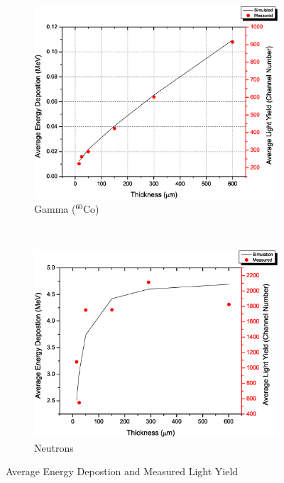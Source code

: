 \documentclass{anstrans}
\newcommand{\iso}[2]{${}^{#2}${#1}}
\newcommand{\figurewidth}{0.45\textwidth}
\begin{document}
\begin{figure}[!ht]
	\centering
	\begin{subfigure}[b]{\figurewidth}
    		\includegraphics[width=\textwidth]{G4EDep_LightYield_Co60}
		\caption{Gamma (\iso{Co}{60})}
	\end{subfigure}%
	~
	\begin{subfigure}[b]{\figurewidth}
    		\includegraphics[width=\textwidth]{G4EDep_LightYield_Neutron}
		\caption{Neutrons}
	\end{subfigure}%
	\caption{Average Energy Depostion and Measured Light Yield}
	\label{fig:EDepLightYeild}
\end{figure}
\end{document}
